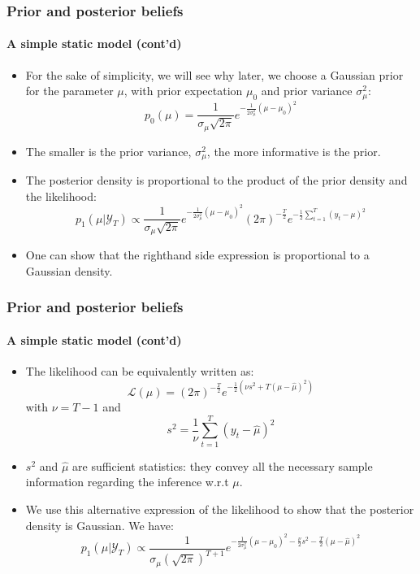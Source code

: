 \documentclass[10pt,slidestop]{beamer}
\newcommand{\AllSample}{ \mathcal Y_T }
\begin{document}
\begin{frame}
  \frametitle{Prior and posterior beliefs}
  \framesubtitle{A simple static model (cont'd)}
  \begin{itemize}
  \item For the sake of simplicity, we will see why later, we choose a
    Gaussian prior for the parameter $\mu$, with prior expectation
    $\mu_0$ and prior variance $\sigma_{\mu}^2$:
    \[
    p_0(\mu) = \frac{1}{\sigma_{\mu}\sqrt{2\pi}}e^{-\frac{1}{2\sigma_{\mu}^2}\left(\mu-\mu_0\right)^2}
    \]
  \item The smaller is the prior variance, $\sigma_{\mu}^2$, the more
    informative is the prior.
  \item The posterior density is proportional to the product of the
    prior density and the likelihood:
    \[
    p_1(\mu|\AllSample) \propto \frac{1}{\sigma_{\mu}\sqrt{2\pi}}e^{-\frac{1}{2\sigma_{\mu}^2}\left(\mu-\mu_0\right)^2}(2\pi)^{-\frac{T}{2}}e^{-\frac{1}{2}\sum_{t=1}^T(y_t-\mu)^2}
    \]
  \item One can show that the righthand side expression is
    proportional to a Gaussian density.
  \end{itemize}
\end{frame}

\begin{frame}
  \frametitle{Prior and posterior beliefs}
  \framesubtitle{A simple static model (cont'd)}

  \begin{itemize}

  \item The likelihood can be equivalently written as:
    \[
    \mathcal L(\mu) =  (2\pi)^{-\frac{T}{2}}e^{-\frac{1}{2}\left(\nu s^2 + T \left(\mu-\widehat{\mu}\right)^2\right)}
    \]
    with $\nu=T-1$ and
    \[
    s^2 = \frac{1}{\nu}\sum_{t=1}^T\left(y_t-\widehat{\mu}\right)^2
    \]

  \item $s^2$ and $\widehat{\mu}$ are sufficient statistics:
    they convey all the necessary sample information regarding the
    inference w.r.t $\mu$.

  \item We use this alternative expression of the likelihood to show
    that the posterior density is Gaussian. We have:
    \[
    p_1(\mu|\AllSample) \propto \frac{1}{\sigma_{\mu}\left(\sqrt{2\pi}\right)^{T+1}}e^{-\frac{1}{2\sigma_{\mu}^2}\left(\mu-\mu_0\right)^2-\frac{\nu}{2}s^2 - \frac{T}{2} \left(\mu-\widehat{\mu}\right)^2}
    \]

  \end{itemize}
\end{frame}
\end{document}
